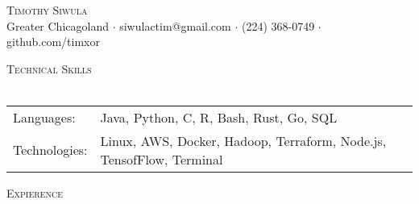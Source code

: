 \documentclass[a4paper]{article}
\newcommand{\lineunder} {
    \vspace*{-8pt} \\
    \hspace*{-18pt} \hrulefill \\
}
\newcommand{\header} [1] {
    {\hspace*{-18pt}\vspace*{6pt} \textsc{#1}}
    \vspace*{-6pt} \lineunder
}
\begin{document}
\vspace*{-40pt}

    

\vspace*{-10pt}
\begin{center}
	{\Huge \scshape {Timothy Siwula}}\\
	Greater Chicagoland $\cdot$ siwulactim@gmail.com $\cdot$ (224) 368-0749 $\cdot$ github.com/timxor\\
\end{center}

\header{Technical Skills}
\begin{tabular}{ l l }
	Languages:    & Java, Python, C, R, Bash, Rust, Go, SQL                              \\
	Technologies: & Linux, AWS, Docker, Hadoop, Terraform, Node.js, TensofFlow, Terminal \\
\end{tabular}
\vspace{2mm}

\header{Expierence}
\vspace{1mm}
\end{document}
